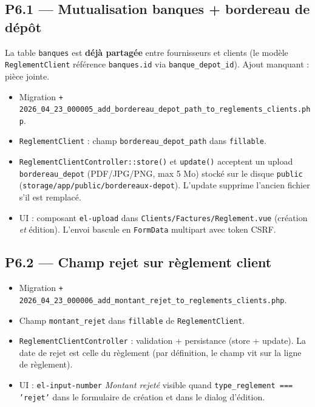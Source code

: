 \documentclass[11pt,a4paper]{article}
\newcommand{\modfile}[1]{\texttt{\small #1}}
\newcommand{\newfile}[1]{\texttt{\small\textcolor{accent}{+ #1}}}
\begin{document}
\subsection{P6.1 --- Mutualisation banques + bordereau de dépôt}

La table \texttt{banques} est \textbf{déjà partagée} entre fournisseurs et
clients (le modèle \texttt{ReglementClient} référence \texttt{banques.id} via
\texttt{banque\_depot\_id}). Ajout manquant : pièce jointe.

\begin{itemize}[leftmargin=1.4em]
  \item Migration \newfile{2026\_04\_23\_000005\_add\_bordereau\_depot\_path\_to\_reglements\_clients.php}.
  \item \modfile{ReglementClient} : champ \texttt{bordereau\_depot\_path} dans
    \texttt{fillable}.
  \item \modfile{ReglementClientController::store()} et \texttt{update()} acceptent
    un upload \texttt{bordereau\_depot} (PDF/JPG/PNG, max 5 Mo) stocké sur le
    disque \texttt{public} (\texttt{storage/app/public/bordereaux-depot}).
    L'update supprime l'ancien fichier s'il est remplacé.
  \item UI : composant \texttt{el-upload} dans \modfile{Clients/Factures/Reglement.vue}
    (création \emph{et} édition). L'envoi bascule en \texttt{FormData}
    multipart avec token CSRF.
\end{itemize}

\subsection{P6.2 --- Champ rejet sur règlement client}

\begin{itemize}[leftmargin=1.4em]
  \item Migration \newfile{2026\_04\_23\_000006\_add\_montant\_rejet\_to\_reglements\_clients.php}.
  \item Champ \texttt{montant\_rejet} dans \texttt{fillable} de
    \modfile{ReglementClient}.
  \item \modfile{ReglementClientController} : validation + persistance (store +
    update). La date de rejet est celle du règlement (par définition, le
    champ vit sur la ligne de règlement).
  \item UI : \texttt{el-input-number} \emph{Montant rejeté} visible quand
    \texttt{type\_reglement === 'rejet'} dans le formulaire de création et
    dans le dialog d'édition.
\end{itemize}
\end{document}
